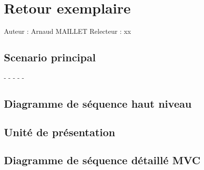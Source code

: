 \documentclass[a4paper,10pt]{report}
\begin{document}
\chapter*{Retour exemplaire}

Auteur : Arnaud MAILLET
Relecteur : xx

\bigskip
\section*{Scenario principal}
\begin{flushleft}
-
-
-
-
-
\end{flushleft}

\bigskip

\section*{Diagramme de séquence haut niveau}

\newpage

\section*{Unité de présentation}

\section*{Diagramme de séquence détaillé MVC}

\newpage
\end{document}

